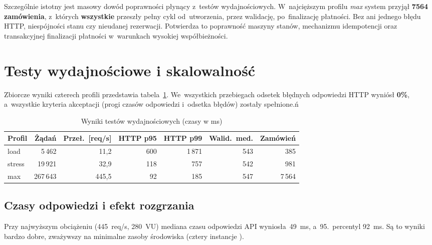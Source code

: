 Szczególnie istotny jest masowy dowód poprawności płynący z~testów wydajnościowych. W~najcięższym profilu
\emph{max} system przyjął \textbf{7564 zamówienia}, z~których \textbf{wszystkie} przeszły pełny cykl od~utworzenia,
przez walidację, po~finalizację płatności. Bez ani jednego błędu HTTP, niespójności stanu czy nieudanej
rezerwacji. Potwierdza to poprawność maszyny stanów, mechanizmu idempotencji oraz transakcyjnej finalizacji
płatności w~warunkach wysokiej współbieżności.

\section{Testy wydajnościowe i skalowalność}
\label{sec:testy-wydajnosciowe}

Zbiorcze wyniki czterech profili przedstawia tabela~\ref{tab:wyniki-wydajnosc}. We~wszystkich przebiegach odsetek
błędnych odpowiedzi HTTP wyniósł \textbf{0\%}, a~wszystkie kryteria akceptacji (progi czasów odpowiedzi i~odsetka
błędów) zostały spełnione.ń

\begin{table}[H]
    \centering
    \caption{Wyniki testów wydajnościowych (czasy w ms)}
    \label{tab:wyniki-wydajnosc}
    \small
    \begin{tabular}{lrrrrrr}
        \toprule
        \textbf{Profil} & \textbf{Żądań} & \textbf{Przeł.\ [req/s]} & \textbf{HTTP p95} & \textbf{HTTP p99} & \textbf{Walid.\ med.} & \textbf{Zamówień} \\
        \midrule
        load   & 5\,462   & 11{,}2  & 600 & 1\,871 & 543 & 385 \\
        stress & 19\,921  & 32{,}9  & 118 & 757    & 542 & 981 \\
        max    & 267\,643 & 445{,}5 & 92  & 185    & 547 & 7\,564 \\
        \bottomrule
    \end{tabular}
\end{table}

\subsection{Czasy odpowiedzi i efekt rozgrzania}
\label{subsec:czasy-odpowiedzi}

Przy najwyższym obciążeniu (445~req/s, 280~VU) mediana czasu odpowiedzi API wyniosła~49~ms, a~95.~percentyl
92~ms. Są to wyniki bardzo dobre, zważywszy na minimalne zasoby środowiska (cztery instancje ).

